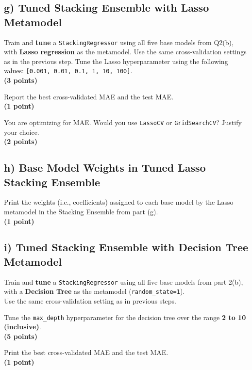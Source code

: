 \documentclass[
  letterpaper,
  DIV=11,
  numbers=noendperiod]{scrreprt}
\begin{document}
\subsection{g) Tuned Stacking Ensemble with Lasso
Metamodel}\label{g-tuned-stacking-ensemble-with-lasso-metamodel}

Train and \textbf{tune} a \texttt{StackingRegressor} using all five base
models from Q2(b), with \textbf{Lasso regression} as the metamodel. Use
the same cross-validation settings as in the previous step. Tune the
Lasso hyperparameter using the following values:
\texttt{{[}0.001,\ 0.01,\ 0.1,\ 1,\ 10,\ 100{]}}.\\
\textbf{(3 points)}

Report the best cross-validated MAE and the test MAE.\\
\textbf{(1 point)}

You are optimizing for MAE. Would you use \texttt{LassoCV} or
\texttt{GridSearchCV}? Justify your choice.\\
\textbf{(2 points)}

\subsection{h) Base Model Weights in Tuned Lasso Stacking
Ensemble}\label{h-base-model-weights-in-tuned-lasso-stacking-ensemble}

Print the weights (i.e., coefficients) assigned to each base model by
the Lasso metamodel in the Stacking Ensemble from part (g).\\
\textbf{(1 point)}

\subsection{i) Tuned Stacking Ensemble with Decision Tree
Metamodel}\label{i-tuned-stacking-ensemble-with-decision-tree-metamodel}

Train and \textbf{tune} a \texttt{StackingRegressor} using all five base
models from part 2(b), with a \textbf{Decision Tree} as the metamodel
(\texttt{random\_state=1}).\\
Use the same cross-validation setting as in previous steps.

Tune the \texttt{max\_depth} hyperparameter for the decision tree over
the range \textbf{2 to 10 (inclusive)}.\\
\textbf{(5 points)}

Print the best cross-validated MAE and the test MAE.\\
\textbf{(1 point)}
\end{document}
